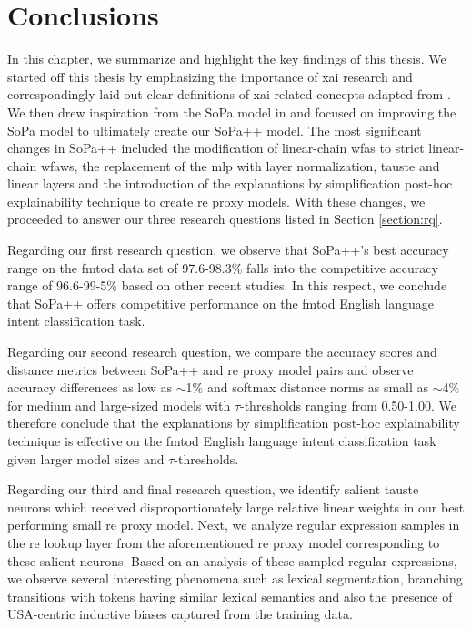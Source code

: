 \chapter{Conclusions}

\label{chapter:conclusions}

In this chapter, we summarize and highlight the key findings of this thesis. We
started off this thesis by emphasizing the importance of \ac{xai} research and
correspondingly laid out clear definitions of \ac{xai}-related concepts adapted
from \citet{arrieta2020explainable}. We then drew inspiration from the SoPa
model in \citet{schwartz2018sopa} and focused on improving the SoPa model to
ultimately create our SoPa++ model. The most significant changes in SoPa++
included the modification of linear-chain \ac{wfas} to strict linear-chain
\ac{wfaws}, the replacement of the \ac{mlp} with layer normalization,
\ac{tauste} and linear layers and the introduction of the explanations by
simplification post-hoc explainability technique to create \ac{re} proxy models.
With these changes, we proceeded to answer our three research questions listed
in Section \ref{section:rq}.

Regarding our first research question, we observe that SoPa++'s best accuracy
range on the \ac{fmtod} data set of 97.6-98.3$\%$ falls into the competitive accuracy
range of 96.6-99-5$\%$ based on other recent studies. In this respect, we
conclude that SoPa++ offers competitive performance on the \ac{fmtod} English
language intent classification task.

Regarding our second research question, we compare the accuracy scores and
distance metrics between SoPa++ and \ac{re} proxy model pairs and observe accuracy
differences as low as $\sim$1$\%$ and softmax distance norms as small as $\sim$4$\%$ for
medium and large-sized models with $\tau$-thresholds ranging from 0.50-1.00. We
therefore conclude that the explanations by simplification post-hoc
explainability technique is effective on the \ac{fmtod} English language intent
classification task given larger model sizes and $\tau$-thresholds.

Regarding our third and final research question, we identify salient \ac{tauste}
neurons which received disproportionately large relative linear weights in our
best performing small \ac{re} proxy model. Next, we analyze regular expression
samples in the \ac{re} lookup layer from the aforementioned \ac{re} proxy model
corresponding to these salient neurons. Based on an analysis of these sampled
regular expressions, we observe several interesting phenomena such as lexical
segmentation, branching transitions with tokens having similar lexical semantics
and also the presence of USA-centric inductive biases captured from the training
data.

